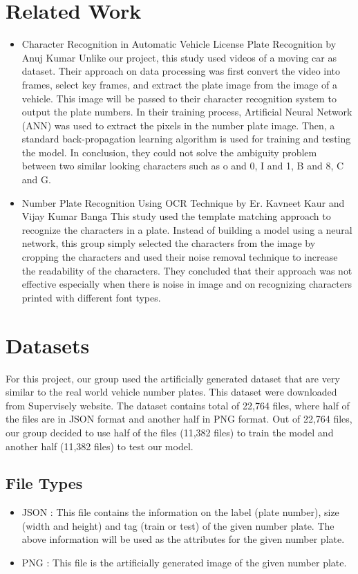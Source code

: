 \documentclass[conference]{IEEEtran}
\begin{document}
\section{Related Work}
\begin{itemize}
\item Character Recognition in Automatic Vehicle License Plate Recognition by Anuj Kumar \cite{b3} Unlike our project, this study used videos of a moving car as dataset. Their approach on data processing was first convert the video into frames, select key frames, and extract the plate image from the image of a vehicle. This image will be passed to their character recognition system to output the plate numbers. In their training process, Artificial Neural Network (ANN) was used to extract the pixels in the number plate image. Then, a standard back-propagation learning algorithm is used for training and testing the model. In conclusion, they could not solve the ambiguity problem between two similar looking characters such as o and 0, I and 1, B and 8, C and G.
\item Number Plate Recognition Using OCR Technique by Er. Kavneet Kaur and Vijay Kumar Banga \cite{b4} This study used the template matching approach to recognize the characters in a plate. Instead of building a model using a neural network, this group simply selected the characters from the image by cropping the characters and used their noise removal technique to increase the readability of the characters. They concluded that their approach was not effective especially when there is noise in image and on recognizing characters printed with different font types.
\end{itemize}

\section{Datasets}
For this project, our group used the artificially generated dataset that are very similar to the real world vehicle number plates. This dataset were downloaded from Supervisely website. The dataset contains total of 22,764 files, where half of the files are in JSON format and another half in PNG format. Out of 22,764 files, our group decided to use half of the files (11,382 files) to train the model and another half (11,382 files) to test our model.

\subsection{File Types}
\begin{itemize}
\item JSON : This file contains the information on the label (plate number), size (width and height) and tag (train or test) of the given number plate. The above information will be used as the attributes for the given number plate.
\item PNG : This file is the artificially generated image of the given number plate.
\end{itemize}
\end{document}
